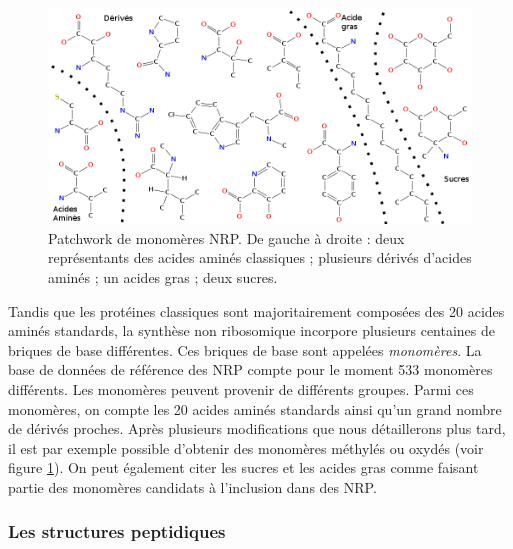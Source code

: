 \begin{figure}[h!]
  \begin{center}
    \includegraphics[width=450px]{Figures/bio/Intro/monos/monos.png}
    \caption{\label{monomers_example}Patchwork de monomères NRP.
    De gauche à droite : deux représentants des acides aminés classiques ; plusieurs dérivés d'acides aminés ; un acides gras ; deux sucres.}
  \end{center}
\end{figure}

Tandis que les protéines classiques sont majoritairement composées des 20 acides aminés standards, la synthèse non ribosomique incorpore plusieurs centaines de briques de base différentes.
Ces briques de base sont appelées {\em monomères}.
La base de données de référence des NRP compte pour le moment 533 monomères différents.
Les monomères peuvent provenir de différents groupes.
Parmi ces monomères, on compte les 20 acides aminés standards ainsi qu'un grand nombre de dérivés proches.
Après plusieurs modifications que nous détaillerons plus tard, il est par exemple possible d'obtenir des monomères méthylés ou oxydés (voir figure \ref{monomers_example}).
On peut également citer les sucres et les acides gras comme faisant partie des monomères candidats à l'inclusion dans des NRP.


\subsubsection{Les structures peptidiques}


